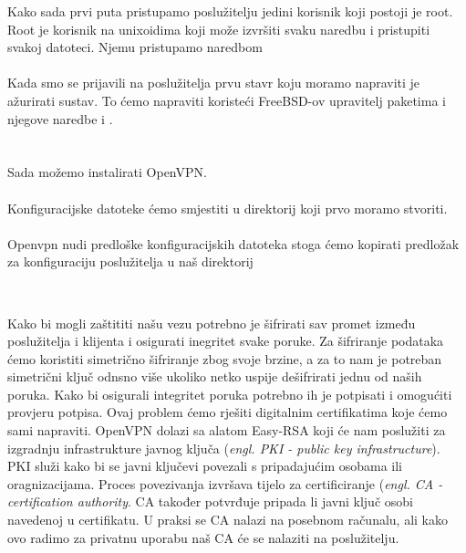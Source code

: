     Kako sada prvi puta pristupamo poslužitelju jedini korisnik
    koji postoji je root. Root je korisnik na unixoidima koji može izvršiti
    svaku naredbu i pristupiti svakoj datoteci. Njemu pristupamo naredbom \\
    
    \noindent
     \\

    Kada smo se prijavili na poslužitelja prvu stavr koju moramo napraviti je
    ažurirati sustav. To ćemo napraviti koristeći FreeBSD-ov upravitelj
    paketima  i njegove naredbe  i . \\

    \noindent
     \\
     \\

    Sada možemo instalirati OpenVPN. \\

    \noindent
     \\

    Konfiguracijske datoteke ćemo smjestiti u direktorij
     koji prvo moramo stvoriti. \\

    \noindent
     \\

    \noindent
    Openvpn nudi predloške konfiguracijskih datoteka stoga ćemo kopirati
    predložak za konfiguraciju poslužitelja u naš direktorij

    \noindent
     \\

        Kako bi mogli zaštititi našu vezu potrebno je šifrirati sav promet
        između poslužitelja i klijenta i osigurati inegritet svake poruke.
        Za šifriranje podataka ćemo koristiti simetrično šifriranje zbog svoje
        brzine, a za to nam je potreban simetrični ključ odnsno više ukoliko
        netko uspije dešifrirati jednu od naših poruka. Kako bi osigurali
        integritet poruka potrebno ih je potpisati i omogućiti provjeru
        potpisa. Ovaj problem ćemo rješiti digitalnim certifikatima koje ćemo
        sami napraviti. OpenVPN dolazi sa alatom Easy-RSA koji će nam poslužiti za izgradnju
        infrastrukture javnog ključa (\textit{engl. PKI - public key
        infrastructure}). PKI služi kako bi se javni ključevi povezali s
        pripadajućim osobama ili oragnizacijama. Proces povezivanja izvršava
        tijelo za certificiranje (\textit{engl. CA - certification authority}.
        CA također potvrđuje pripada li javni ključ osobi navedenoj u
        certifikatu. U praksi se CA nalazi na posebnom računalu, ali kako ovo
        radimo za privatnu uporabu naš CA će se nalaziti na poslužitelju.

